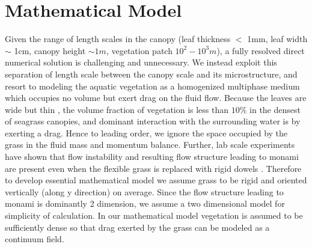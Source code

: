 \documentclass[12pt]{report}   %
\begin{document}
\chapter{Mathematical Model}
Given the range of length scales in the canopy (leaf thickness $<$ 1mm, leaf width $\sim$ 1cm, canopy height $\sim 1m$, vegetation patch $10^2-10^3 m$), a fully resolved direct numerical solution is challenging and unnecessary. We instead exploit this separation of length scale between the canopy scale and its microstructure, and resort to modeling the aquatic vegetation as a homogenized multiphase medium which occupies no volume but exert drag on the fluid flow.
Because the leaves are wide but thin , the volume fraction of vegetation is less than $10\%$ in the densest of seagrass canopies, and dominant interaction with the surrounding water is by exerting a drag. Hence to leading order, we ignore the space occupied by the grass in the fluid mass and momentum balance.
Further, lab scale experiments have shown that flow instability and resulting flow structure leading to monami are present even when the flexible grass is replaced with rigid dowels \cite{Ghisal02, Nepf06}. Therefore to develop essential mathematical model we assume grass to be rigid and oriented vertically (along y direction) on average. Since the flow structure leading to monami is dominantly 2 dimension, we assume a two dimensional model for simplicity of calculation. In our mathematical model vegetation is assumed to be sufficiently dense so that drag exerted by the grass can be modeled as a continuum field. 
\end{document}
